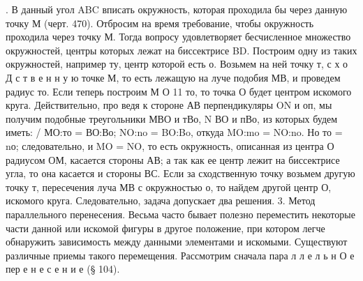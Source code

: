 .
В данный угол ABC вписать окружность, которая проходила бы через данную точку М (черт. 470).
Отбросим на время требование, чтобы окружность проходила через точку М. Тогда вопросу удовлетворяет бесчисленное множество окружностей, центры которых лежат на биссектрисе BD. Построим одну из таких окружностей, например ту, центр которой есть о. Возьмем на ней точку т, с х о Д с т в е н н у ю точке М, то есть лежащую на луче подобия МВ, и проведем радиус то. Если теперь построим М О 11 то, то точка О будет центром искомого круга. Действительно, про ведя к стороне АВ перпендикуляры ON и оп, мы получим подобные треугольники МВО и тВо, N ВО и пВо, из которых будем иметь:                                                                                                                                                                                                                                                                                                                                                                                                                                                                                                                                                                                                                                                                                                                                                                    /
МО:то = ВО:Во; NO:no = BO:Bo, откуда
MO:mo = NO:no.
Но то = nо; следовательно, и MO = NO, то есть окружность, описанная из центра О радиусом ОМ, касается стороны АВ; а так как ее центр лежит на биссектрисе угла, то она касается и стороны ВС.
Если за сходственную точку возьмем другую точку т, пересечения луча МВ с окружностью о, то найдем другой центр О, искомого круга. Следовательно, задача допускает два решения.
3. Метод параллельного перенесения. Весьма часто бывает полезно переместить некоторые части данной или искомой фигуры в другое положение, при котором легче обнаружить зависимость между данными элементами и искомыми. Существуют различные приемы такого перемещения. Рассмотрим сначала пара л л е л ь н О е   пер е н е с е н и е   (§ 104).

